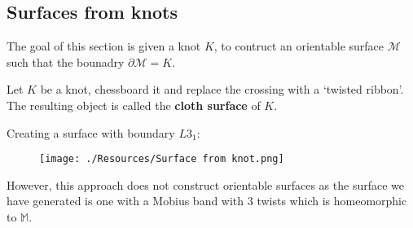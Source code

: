 \documentclass[12pt, a4paper]{article}
\begin{document}

\subsection{Surfaces from knots}

\begin{mdnote}
    The goal of this section is given a knot \(K\), to contruct an orientable surface \(\mathcal{M}\) such that the bounadry \(\partial \mathcal{M}=K\). 
\end{mdnote}

\begin{definition}
    Let \(K\) be a knot, chessboard it and replace the crossing with a `twisted ribbon'. The resulting object is called the \textbf{cloth surface} of \(K\).
\end{definition}

\begin{mdexample}
    Creating a surface with boundary \(L3_1\):
    \begin{figure}[H]
         \begin{center}
             \texttt{[image: ./Resources/Surface from knot.png]}
         \end{center}
    \end{figure}
    However, this approach does not construct orientable surfaces as the surface we have generated is one with a Mobius band with \(3\) twists which is homeomorphic to \(\mathbb{M}\).
\end{mdexample}
\end{document}
